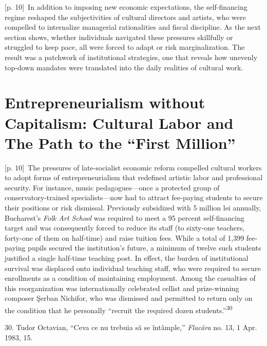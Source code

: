 \documentclass[10pt,a4paper]{article}
\begin{document}
{\scriptsize\color{gray} [p. 10]}\ In addition to imposing new economic expectations, the self-financing regime reshaped the subjectivities of cultural directors and artists, who were compelled to internalize managerial rationalities and fiscal discipline. As the next section shows, whether individuals navigated these pressures skillfully or struggled to keep pace, all were forced to adapt or risk marginalization. The result was a patchwork of institutional strategies, one that reveals how unevenly top-down mandates were translated into the daily realities of cultural work.\par
{}\section*{Entrepreneurialism without Capitalism: Cultural Labor and The Path to the “First Million”}
{\scriptsize\color{gray} [p. 10]}\ The pressures of late-socialist economic reform compelled cultural workers to adopt forms of entrepreneurialism that redefined artistic labor and professional security. For instance, music pedagogues—once a protected group of conservatory-trained specialists—now had to attract fee-paying students to secure their positions or risk dismissal. Previously subsidized with 5 million lei annually, Bucharest’s \textit{Folk Art School} was required to meet a 95 percent self-financing target and was consequently forced to reduce its staff (to sixty-one teachers, forty-one of them on half-time) and raise tuition fees. While a total of 1,399 fee-paying pupils secured the institution’s future, a minimum of twelve such students justified a single half-time teaching post. In effect, the burden of institutional survival was displaced onto individual teaching staff, who were required to secure enrollments as a condition of maintaining employment. Among the casualties of this reorganization was internationally celebrated cellist and prize-winning composer Şerban Nichifor, who was dismissed and permitted to return only on the condition that he personally “recruit the required dozen students.”\nobreak\textsuperscript{30}\par{\small 30. Tudor Octavian, “Ceva ce nu trebuia să se întâmple,” \textit{Flacăra} no. 13, 1 Apr. 1983, 15.\par}
\end{document}
